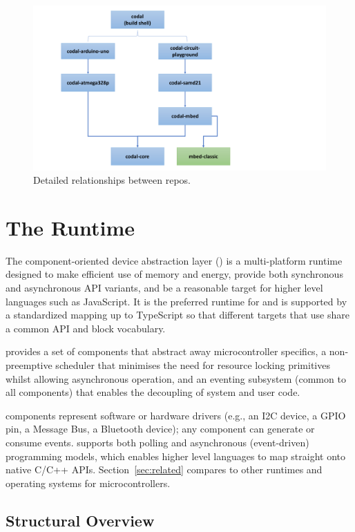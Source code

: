 \begin{figure}[t]
    \includegraphics[width=4.5in]{codalFig.pdf}
    \caption{\label{fig:codal}Detailed relationships between \CO repos.}
\end{figure}

\section{The \CO Runtime}
\label{sec:codal}

The component-oriented device abstraction layer (\CO) is a multi-platform runtime designed to make efficient use of memory and energy, provide both synchronous and asynchronous API variants, and be a reasonable target for higher level languages such as JavaScript.  It is the preferred runtime
for \MC and is supported by a standardized mapping up to TypeScript so that different \MC targets that use \CO share a common API and block vocabulary.

\CO provides a set of components that abstract away microcontroller specifics, a non-preemptive scheduler that minimises the need for resource locking primitives whilst allowing asynchronous operation, and an eventing subsystem (common to all components) that enables the decoupling of system and user code.

\CO components represent software or hardware drivers (e.g., an I2C device, a GPIO pin, a Message Bus, a Bluetooth device); any component can generate or consume events. \CO supports both polling and asynchronous (event-driven) programming models, which enables higher level languages to map straight onto native C/C++ APIs. Section~\ref{sec:related} compares \CO to other runtimes and operating systems for microcontrollers.


\subsection{Structural Overview}

